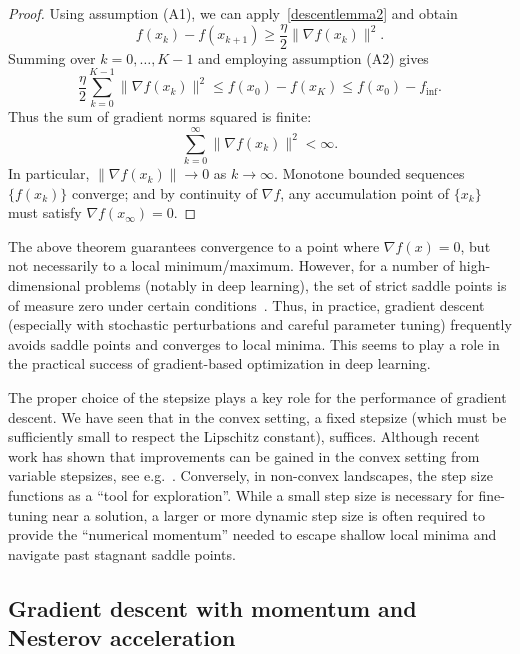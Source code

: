 \begin{proof}
Using assumption (A1), we can apply~\eqref{descentlemma2} and obtain
$$
f(x_k) - f(x_{k+1}) \ge \frac{\eta}{2}\|\nabla f(x_k)\|^2.
$$
Summing over $k=0,\dots,K-1$ and employing assumption (A2) gives
$$
\frac{\eta}{2}\sum_{k=0}^{K-1}\|\nabla f(x_k)\|^2
\le f(x_0) - f(x_K)
\le f(x_0) - f_{\inf}.
$$
Thus the sum of gradient norms squared is finite:
$$
\sum_{k=0}^{\infty} \|\nabla f(x_k)\|^2 < \infty.
$$
In particular, $\|\nabla f(x_k)\| \to 0$ as $k \to \infty$.
Monotone bounded sequences $\{f(x_k)\}$ converge; and by continuity of $\nabla f$, any accumulation point of $\{x_k\}$ must satisfy $\nabla f(x_\infty)=0.$  
\end{proof}



The above theorem guarantees convergence to a point where $\nabla f(x)=0$, but not necessarily to a local minimum/maximum.
However, for a number of high-dimensional problems (notably in deep learning), the set of strict saddle points is of measure zero under certain conditions~\cite{lee2016gradient,panageas2017,sun2018geometric}.
Thus, in practice, gradient descent (especially with stochastic perturbations and careful parameter tuning) frequently avoids saddle points and converges to local minima.
This seems to play a role in the practical success of gradient-based optimization in deep learning.

\medskip
The proper choice of the stepsize  plays a key role for the performance of gradient descent. We have seen that in the convex setting, a fixed stepsize (which must be sufficiently small to respect the Lipschitz constant), suffices. Although recent work has shown that improvements can be gained in the convex setting from variable stepsizes, see e.g.~\cite{altschuler2024acceleration}.
Conversely, in non-convex landscapes, the step size functions as a ``tool for exploration''. While a small step size is necessary for fine-tuning near a solution, a larger or more dynamic step size is often required to provide the ``numerical momentum'' needed to escape shallow local minima and navigate past stagnant saddle points. 




\subsection{Gradient descent with momentum and Nesterov acceleration}\label{s:gd:nesterovaccelation}



